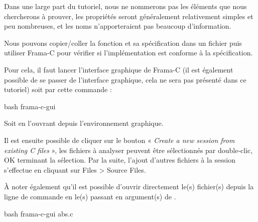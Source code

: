 


Dans une large part du tutoriel, nous ne nommerons pas les éléments que nous
chercherons à prouver, les propriétés seront généralement relativement simples
et peu nombreuses, et les noms n'apporteraient pas beaucoup d'information.



Nous pouvons copier/coller la fonction  et sa spécification dans un
fichier  puis utiliser Frama-C pour vérifier si l'implémentation
est conforme à la spécification.



Pour cela, il faut lancer l'interface graphique de Frama-C (il est également
possible de se passer de l'interface graphique, cela ne sera pas présenté
dans ce tutoriel) soit par cette commande :



\begin{CodeBlock}{bash}
frama-c-gui
\end{CodeBlock}



Soit en l'ouvrant depuis l'environnement graphique.



Il est ensuite possible de cliquer sur le bouton « \textit{Create a new session from
existing C files} », les fichiers à analyser peuvent être sélectionnés par
double-clic, OK terminant la sélection. Par la suite, l'ajout d'autres
fichiers à la session s'effectue en cliquant sur Files > Source Files.



À noter également qu'il est possible d'ouvrir directement le(s) fichier(s)
depuis la ligne de commande en le(s) passant en argument(s) de .



\begin{CodeBlock}{bash}
frama-c-gui abs.c
\end{CodeBlock}





